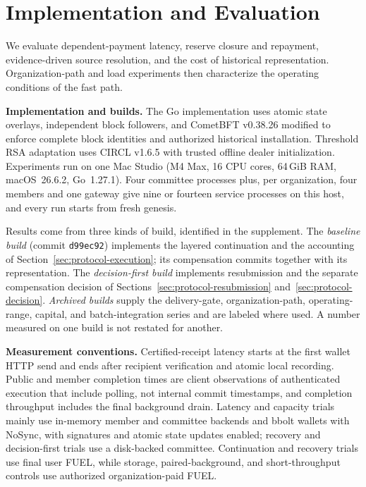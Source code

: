 
\section{Implementation and Evaluation}
\label{sec:evaluation}

We evaluate dependent-payment latency, reserve closure and repayment,
evidence-driven source resolution, and the cost of historical representation.
Organization-path and load experiments then characterize the operating
conditions of the fast path.

\noindent\textbf{Implementation and builds.}
The Go implementation uses atomic state overlays, independent block
followers, and CometBFT v0.38.26 modified to enforce complete block
identities and authorized historical installation. Threshold RSA adaptation
uses CIRCL v1.6.5 with trusted offline dealer initialization. Experiments run
on one Mac Studio (M4 Max, 16 CPU cores, 64\,GiB RAM, macOS~26.6.2,
Go~1.27.1). Four committee processes plus, per organization, four members and
one gateway give nine or fourteen service processes on this host, and every
run starts from fresh genesis.

Results come from three kinds of build, identified in the supplement. The
\emph{baseline build} (commit \texttt{d99ec92}) implements the layered
continuation and the accounting of Section~\ref{sec:protocol-execution}; its
compensation commits together with its representation. The
\emph{decision-first build} implements resubmission and the separate
compensation decision of Sections~\ref{sec:protocol-resubmission}
and~\ref{sec:protocol-decision}. \emph{Archived builds} supply the
delivery-gate, organization-path, operating-range, capital, and
batch-integration series and are labeled where used. A number measured on one
build is not restated for another.

\noindent\textbf{Measurement conventions.}
Certified-receipt latency starts at the first wallet HTTP send and ends after
recipient verification and atomic local recording. Public and member
completion times are client observations of authenticated execution that
include polling, not internal commit timestamps, and completion throughput
includes the final background drain. Latency and capacity trials mainly use
in-memory member and committee backends and bbolt wallets with NoSync, with
signatures and atomic state updates enabled; recovery and decision-first
trials use a disk-backed committee. Continuation and recovery trials use final
user FUEL, while storage, paired-background, and short-throughput controls use
authorized organization-paid FUEL.

